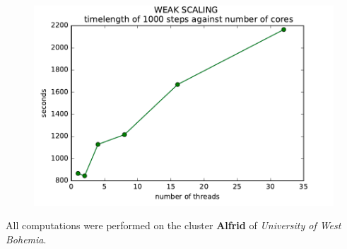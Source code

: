 \begin{figure}[H]
 \centering 
 \includegraphics[width=1\textwidth]{./img/weakscaling}
\end{figure}

All computations were performed on the cluster \textbf{Alfrid} of \textit{University of West Bohemia}.

